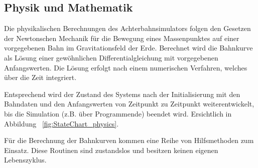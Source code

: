 \subsection{Physik und Mathematik}

Die physikalischen Berechnungen des Achterbahnsimulators folgen den Gesetzen der Newtonschen Mechanik für die Bewegung
eines Massenpunktes auf einer vorgegebenen Bahn im Gravitationsfeld der Erde. Berechnet wird die Bahnkurve als Lösung
einer gewöhnlichen Differentialgleichung mit vorgegebenen Anfangswerten. Die Lösung erfolgt nach einem numerischen
Verfahren, welches über die Zeit integriert.

Entsprechend wird der Zustand des Systems nach der Initialisierung mit den Bahndaten und den Anfangswerten von Zeitpunkt
zu Zeitpunkt weiterentwickelt, bis die Simulation (z.B. über Programmende) beendet wird. Ersichtlich in Abbildung ~\ref{fig:StateChart_physics}.

Für die Berechnung der Bahnkurven kommen eine Reihe von Hilfsmethoden zum Einsatz. Diese Routinen sind zustandslos und
besitzen keinen eigenen Lebenszyklus.

